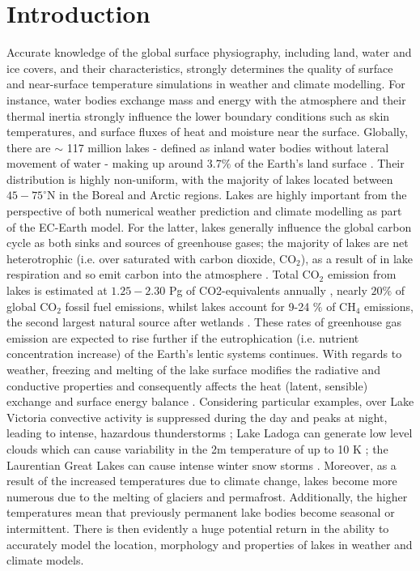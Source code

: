 \documentclass[hess, twostagejnl]{copernicus}
\begin{document}
\section{Introduction}
Accurate knowledge of the global surface physiography, including land, water and ice covers, and their characteristics, strongly determines the quality of surface and near-surface temperature simulations in weather and climate modelling. For instance, water bodies exchange mass and energy with the atmosphere and their thermal inertia strongly influence the lower boundary conditions such as skin temperatures, and surface fluxes of heat and moisture near the surface. Globally, there are $\sim$ 117 million lakes - defined as inland water bodies without lateral movement of water - making up around 3.7$\%$ of the Earth's land surface \citep{Verpoorter2014}. Their distribution is highly non-uniform, with the majority of lakes located between $45-75^{\circ}$N in the Boreal and Arctic regions. Lakes are highly important from the perspective of both numerical weather prediction and climate modelling as part of the EC-Earth model. For the latter, lakes generally influence the global carbon cycle as both sinks and sources of greenhouse gases; the majority of lakes are net heterotrophic (i.e. over saturated with carbon dioxide, CO$_2$), as a result of in lake respiration and so emit carbon into the atmosphere \citep{Pace2005,Tranvik2009}.  Total CO$_2$ emission from lakes is estimated at $1.25 - 2.30$ Pg of CO2-equivalents annually \citep{DelSontro2018}, nearly $20 \%$ of global CO$_2$ fossil fuel emissions, whilst lakes account for 9-24 $\%$  of CH$_4$ emissions, the second largest natural source after wetlands \citep{Saunois2020}. These rates of greenhouse gas emission are expected to rise further if the eutrophication (i.e. nutrient concentration increase) of the Earth's lentic systems continues. With regards to weather, freezing and melting of the lake surface modifies the radiative and conductive properties and consequently affects the heat (latent, sensible) exchange and surface energy balance \citep{Huang2019,Peng2020,Franz2018}. Considering particular examples, over Lake Victoria convective activity is suppressed during the day and peaks at night, leading to intense, hazardous thunderstorms \citep{Thiery2015,Thiery_2017}; Lake Ladoga can generate low level clouds which can cause variability in the 2m temperature of up to 10 K \citep{Eerola2014}; the Laurentian Great Lakes can cause intense winter snow storms \citep{Notaro2013,Vavrus2013}. Moreover, as a result of the increased temperatures due to climate change, lakes become more numerous due to the melting of glaciers and permafrost. Additionally, the higher temperatures mean that previously permanent lake bodies become seasonal or intermittent. There is then evidently a huge potential return in the ability to accurately model the location, morphology and properties of lakes in weather and climate models. \newline 
\end{document}
